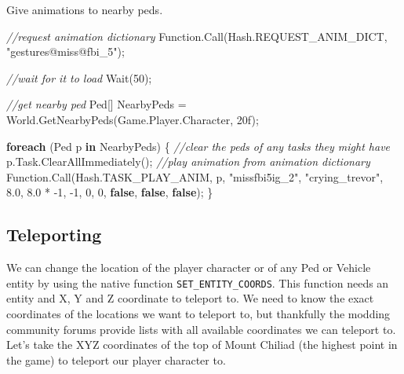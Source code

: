 \documentclass[
  openany]{book}
\newenvironment{Shaded}{\begin{snugshade}}{\end{snugshade}}
\newcommand{\CommentTok}[1]{\textcolor[rgb]{0.56,0.35,0.01}{\textit{#1}}}
\newcommand{\DecValTok}[1]{\textcolor[rgb]{0.00,0.00,0.81}{#1}}
\newcommand{\FloatTok}[1]{\textcolor[rgb]{0.00,0.00,0.81}{#1}}
\newcommand{\FunctionTok}[1]{\textcolor[rgb]{0.00,0.00,0.00}{#1}}
\newcommand{\KeywordTok}[1]{\textcolor[rgb]{0.13,0.29,0.53}{\textbf{#1}}}
\newcommand{\NormalTok}[1]{#1}
\newcommand{\StringTok}[1]{\textcolor[rgb]{0.31,0.60,0.02}{#1}}
\begin{document}
Give animations to nearby peds.

\begin{Shaded}
\begin{Highlighting}[]
\CommentTok{//request animation dictionary}
\NormalTok{Function.}\FunctionTok{Call}\NormalTok{(Hash.}\FunctionTok{REQUEST_ANIM_DICT}\NormalTok{, }\StringTok{"gestures@miss@fbi_5"}\NormalTok{);}

\CommentTok{//wait for it to load}
\FunctionTok{Wait}\NormalTok{(}\DecValTok{50}\NormalTok{);}

\CommentTok{//get nearby ped}
\NormalTok{Ped[] NearbyPeds = World.}\FunctionTok{GetNearbyPeds}\NormalTok{(Game.}\FunctionTok{Player}\NormalTok{.}\FunctionTok{Character}\NormalTok{, 20f);}

\KeywordTok{foreach}\NormalTok{ (Ped p }\KeywordTok{in}\NormalTok{ NearbyPeds)}
\NormalTok{\{   }
    \CommentTok{//clear the peds of any tasks they might have}
\NormalTok{    p.}\FunctionTok{Task}\NormalTok{.}\FunctionTok{ClearAllImmediately}\NormalTok{();}
    \CommentTok{//play animation from animation dictionary}
\NormalTok{    Function.}\FunctionTok{Call}\NormalTok{(Hash.}\FunctionTok{TASK_PLAY_ANIM}\NormalTok{, p, }\StringTok{"missfbi5ig_2"}\NormalTok{, }\StringTok{"crying_trevor"}\NormalTok{, }\FloatTok{8.0}\NormalTok{, }\FloatTok{8.0}\NormalTok{ * }\DecValTok{-1}\NormalTok{, }\DecValTok{-1}\NormalTok{, }\DecValTok{0}\NormalTok{, }\DecValTok{0}\NormalTok{, }\KeywordTok{false}\NormalTok{, }\KeywordTok{false}\NormalTok{, }\KeywordTok{false}\NormalTok{);}
\NormalTok{\}}
\end{Highlighting}
\end{Shaded}

\hypertarget{teleporting}{%
\subsection*{Teleporting}\label{teleporting}}

We can change the location of the player character or of any Ped or Vehicle entity by using the native function \texttt{SET\_ENTITY\_COORDS}. This function needs an entity and X, Y and Z coordinate to teleport to.
We need to know the exact coordinates of the locations we want to teleport to, but thankfully the modding community forums provide lists with all available coordinates we can teleport to. Let's take the XYZ coordinates of the top of Mount Chiliad (the highest point in the game) to teleport our player character to.
\end{document}
